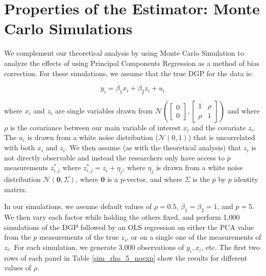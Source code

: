 \documentclass[10pt]{article}
\begin{document}
    \section*{Properties of the Estimator: Monte Carlo Simulations}

        We complement our theoretical analysis by using Monte Carlo Simulation to analyze the effects of using Principal Components Regression as a method of bias correction. For these simulations, we assume that the true DGP for the data is:

        $$y_i = \beta_1 x_i + \beta_2 z_i + u_i$$

        where $x_i$ and $z_i$ are single variables drawn from $\mathcal{N}(\begin{bmatrix} 0\\ 0 \end{bmatrix}, \begin{bmatrix} 1 & \rho\\ \rho & 1\end{bmatrix})$ and where $\rho$ is the covariance between our main variable of interest $x_i$ and the covariate $z_i$. The $u_i$ is drawn from a white noise distribution ($\mathcal{N}(0,1)$) that is uncorrelated with both $x_i$ and $z_i$. We then assume (as with the theoretical analysis) that $z_i$ is not directly observable and instead the researchers only have access to $p$ measurements $z_{i,j}^*$ where $z_{i,j}^* = z_i + \eta_j$, where $\eta_j$ is drawn from a white noise distribution $\mathcal{N}(\mathbf{0},\Sigma)$, where $\mathbf{0}$ is a p-vector, and where $\Sigma$ is the $p$ by $p$ identity matrix.

        In our simulations, we assume default values of $\rho = 0.5$, $\beta_1 = \beta_2 = 1$, and $p=5$. We then vary each factor while holding the others fixed, and perform 1,000 simulations of the DGP followed by an OLS regression on either the PCA value from the $p$ measurements of the true $z_i$, or on a single one of the measurements of $z_i$. For each simulation, we generate 3,000 observations of $y_i,x_i$, etc. The first two rows of each panel in Table \ref{sim_rho_5_noexp} show the results for different values of $\rho$.
\end{document}
